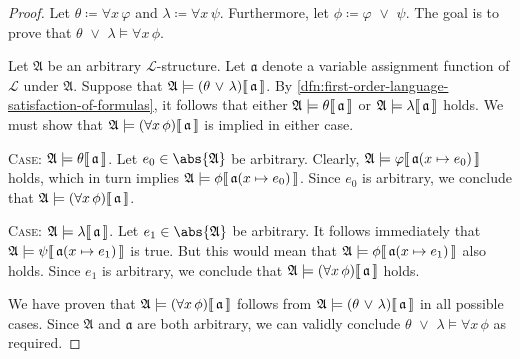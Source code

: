 \begin{proof}
    Let \( \theta \coloneq \forall x \, \varphi \) and \( \lambda \coloneq \forall x \, \psi \). Furthermore, let \( \phi \coloneq \varphi \,\,{\lor}\,\, \psi \).
    The goal is to prove that \( \theta \,\,{\lor}\,\, \lambda \models \forall x \, \phi \).

    \vspace{0.3cm}
    \noindent
    Let \( \mathfrak{A} \) be an arbitrary \( \mathcal{L} \)-structure. Let \( \mathfrak{a} \) denote a variable assignment function of \( \mathcal{L} \)
    under \( \mathfrak{A} \). Suppose that \( \folwffsatisfaction{\mathfrak{A}}{\mleft( \theta \,\,{\lor}\,\, \lambda \mright)}{\mathfrak{a}} \).
    By \cref{dfn:first-order-language-satisfaction-of-formulas}, it follows that either \(  \mathfrak{A} \models \theta\llbracket\, \mathfrak{a} \,\rrbracket \)
    or \(  \mathfrak{A} \models \lambda\llbracket\, \mathfrak{a} \,\rrbracket \) holds.
    We must show that \( \folwffsatisfaction{\mathfrak{A}}{\mleft( \forall x \, \phi \mright)}{\mathfrak{a}} \) is implied in either case.

    \vspace{0.3cm}
    \noindent
    {\scshape Case:} \(  \mathfrak{A} \models \theta\llbracket\, \mathfrak{a} \,\rrbracket \).
    Let \( e_{0} \in \abs{\mathfrak{A}} \) be arbitrary.
    Clearly, \( \folwffsatisfaction{\mathfrak{A}}{\varphi}{ \folmodifiedvariableassignmentfunction{\mathfrak{a}}{x}{e_{0}} } \) holds,
    which in turn implies \( \folwffsatisfaction{\mathfrak{A}}{\phi}{ \folmodifiedvariableassignmentfunction{\mathfrak{a}}{x}{e_{0}} } \).
    Since \( e_{0} \) is arbitrary, we conclude that \( \folwffsatisfaction{\mathfrak{A}}{\mleft( \forall x \, \phi \mright)}{\mathfrak{a}} \).

    \vspace{0.3cm}
    \noindent
    {\scshape Case:} \(  \mathfrak{A} \models \lambda\llbracket\, \mathfrak{a} \,\rrbracket \).
    Let \( e_{1} \in \abs{\mathfrak{A}} \) be arbitrary.
    It follows immediately that \( \folwffsatisfaction{\mathfrak{A}}{\psi}{ \folmodifiedvariableassignmentfunction{\mathfrak{a}}{x}{e_{1}} } \) is true.
    But this would mean that \( \folwffsatisfaction{\mathfrak{A}}{\phi}{ \folmodifiedvariableassignmentfunction{\mathfrak{a}}{x}{e_{1}} } \) also holds.
    Since \( e_{1} \) is arbitrary, we conclude that \( \folwffsatisfaction{\mathfrak{A}}{\mleft( \forall x \, \phi \mright)}{\mathfrak{a}} \) holds.

    \vspace{0.3cm}
    \noindent
    We have proven that \( \folwffsatisfaction{\mathfrak{A}}{\mleft( \forall x \, \phi \mright)}{\mathfrak{a}} \) follows from
    \( \folwffsatisfaction{\mathfrak{A}}{\mleft( \theta \,\,{\lor}\,\, \lambda \mright)}{\mathfrak{a}} \) in all possible cases.
    Since \( \mathfrak{A} \) and \( \mathfrak{a} \) are both arbitrary, we can validly conclude \( \theta \,\,{\lor}\,\, \lambda \models \forall x \, \phi \)
    as required.
\end{proof}

